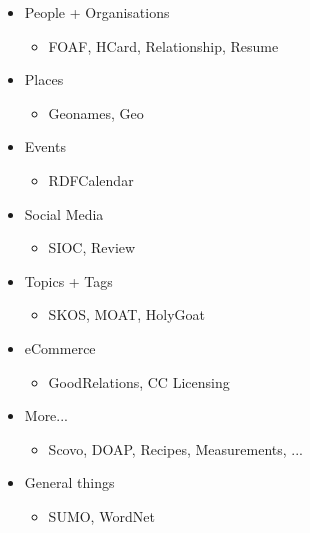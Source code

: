 \documentclass[a4paper,landscape,headrule,footrule,xetex]{foils}
\begin{document}
\begin{itemize}
\item People + Organisations
  \begin{itemize}
  \item FOAF, HCard, Relationship, Resume 
  \end{itemize}
\item Places
  \begin{itemize}
  \item Geonames, Geo 
  \end{itemize}
\item Events
  \begin{itemize}
  \item RDFCalendar 
  \end{itemize}
\item Social Media
  \begin{itemize}
  \item SIOC, Review 
  \end{itemize}
\item Topics + Tags
  \begin{itemize}
  \item SKOS, MOAT, HolyGoat 
  \end{itemize}
\item eCommerce
  \begin{itemize}
  \item GoodRelations, CC Licensing 
  \end{itemize}
\item More...
  \begin{itemize}
  \item Scovo, DOAP, Recipes, Measurements, ... 
  \end{itemize}
\item General things
  \begin{itemize}
  \item SUMO, WordNet
  \end{itemize}
\end{itemize}



\end{document}
